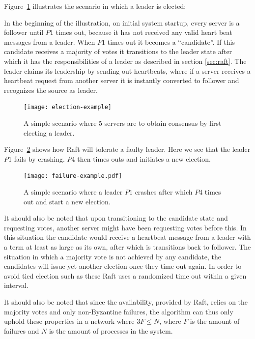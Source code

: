 Figure~\ref{fig:election_example} illustrates the scenario in which a leader is elected:

In the beginning of the illustration, on initial system startup, every server is a follower until $P1$ times out, because it has not received any valid heart beat messages from a leader. When $P1$ times out it becomes a ``candidate''. If this candidate receives a majority of votes it transitions to the leader state after which it has the responsibilities of a leader as described in section \ref{sec:raft}. The leader claims its leadership by sending out heartbeats, where if a server receives a heartbeat request from another server it is instantly converted to follower and recognizes the source as leader.

\begin{figure}[ht!]
\centering
\texttt{[image: election-example]}
\caption{A simple scenario where 5 servers are to obtain consensus by first electing a leader.}
\label{fig:election_example}
\end{figure}

Figure~\ref{fig:failure_example} shows how Raft will tolerate a faulty leader. Here we see that the leader $P1$ fails by crashing. $P4$ then times outs and initiates a new election.

\begin{figure}[ht!]
\centering
\texttt{[image: failure-example.pdf]}
\caption{A simple scenario where a leader $P1$ crashes after which $P4$ times out and start a new election.}
\label{fig:failure_example}
\end{figure}

It should also be noted that upon transitioning to the candidate state and requesting votes, another server might have been requesting votes before this. In this situation the candidate would receive a heartbeat message from a leader with a term at least as large as its own, after which is transitions back to follower.
The situation in which a majority vote is not achieved by any candidate, the candidates will issue yet another election once they time out again. In order to avoid tied election such as these Raft uses a randomized time out within a given interval.

It should also be noted that since the availability, provided by Raft, relies on the majority votes and only non-Byzantine failures, the algorithm can thus only uphold these properties in a network where $3F \leq N$, where $F$ is the amount of failures and $N$ is the amount of processes in the system.~\cite{Fischer}

